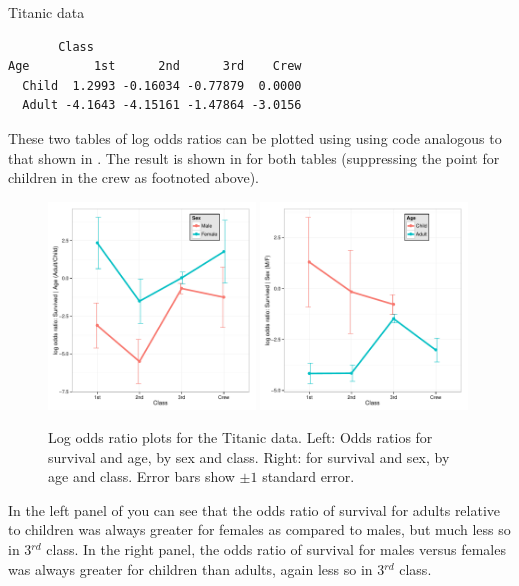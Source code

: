 \documentclass[10pt,krantz2]{krantz}\usepackage[]{graphicx}\usepackage[]{color}
\makeatletter
\newenvironment{kframe}{%
 \def\at@end@of@kframe{}%
 \ifinner\ifhmode%
  \def\at@end@of@kframe{\end{minipage}}%
  \begin{minipage}{\columnwidth}%
 \fi\fi%
 \def\FrameCommand##1{\hskip\@totalleftmargin \hskip-\fboxsep
 \colorbox{shadecolor}{##1}\hskip-\fboxsep
     \hskip-\linewidth \hskip-\@totalleftmargin \hskip\columnwidth}%
 \MakeFramed {\advance\hsize-\width
   \@totalleftmargin\z@ \linewidth\hsize
   \@setminipage}}%
 {\par\unskip\endMakeFramed%
 \at@end@of@kframe}
\newenvironment{knitrout}{}{} %
\renewenvironment{knitrout}{\small\renewcommand{\baselinestretch}{.85}}{} %
\makeatother
\begin{document}
\begin{Example}{Titanic data}
\begin{knitrout}
\begin{kframe}
\begin{verbatim}
       Class
Age         1st      2nd      3rd    Crew
  Child  1.2993 -0.16034 -0.77879  0.0000
  Adult -4.1643 -4.15161 -1.47864 -3.0156
\end{verbatim}
\end{kframe}
\end{knitrout}

These two tables of log odds ratios can be plotted using  using code analogous to that shown
in .  The result is shown in  for both tables
(suppressing the point for children in the crew as footnoted above).
\begin{knitrout}
\color{fgcolor}\begin{figure}[!htbp]

\centerline{\includegraphics[width=0.49\textwidth]{ch05/fig/titanic-lor-plot-1} 
\includegraphics[width=0.49\textwidth]{ch05/fig/titanic-lor-plot-2} }

\caption[Log odds ratio plots for the Titanic data.]{Log odds ratio plots for the Titanic data. Left: Odds ratios for survival and age, by sex and class. Right: for survival and sex, by age and class. Error bars show $\pm 1$ standard error.\label{fig:titanic-lor-plot}}
\end{figure}


\end{knitrout}
In the left panel of  you can see that the odds ratio of
survival for adults relative to children was always greater for females as compared
to males, but much less so in 3$^{rd}$ class.
In the right panel, the odds ratio of survival for males versus females was always
greater for children than adults, again less so in 3$^{rd}$ class.
\end{Example}
\end{document}
